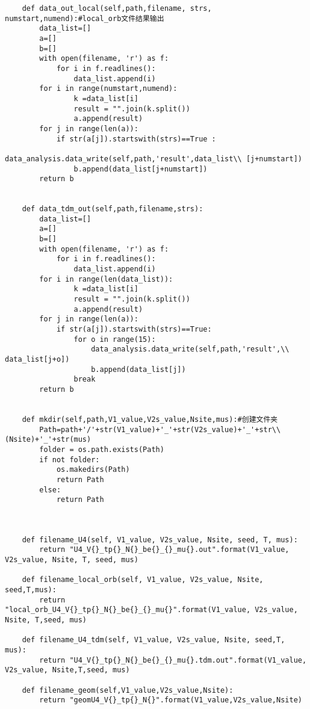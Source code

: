 \begin{description}
\begin{lstlisting}
    def data_out_local(self,path,filename, strs, numstart,numend):#local_orb文件结果输出
        data_list=[]
        a=[]
        b=[]
        with open(filename, 'r') as f:
            for i in f.readlines():
                data_list.append(i)
        for i in range(numstart,numend):
                k =data_list[i]
                result = "".join(k.split())
                a.append(result)
        for j in range(len(a)):
            if str(a[j]).startswith(strs)==True :
                data_analysis.data_write(self,path,'result',data_list\\ [j+numstart])
                b.append(data_list[j+numstart])
        return b


    def data_tdm_out(self,path,filename,strs):
        data_list=[]
        a=[]
        b=[]
        with open(filename, 'r') as f:
            for i in f.readlines():
                data_list.append(i)
        for i in range(len(data_list)):
                k =data_list[i]
                result = "".join(k.split())
                a.append(result)
        for j in range(len(a)):
            if str(a[j]).startswith(strs)==True:
                for o in range(15):
                    data_analysis.data_write(self,path,'result',\\ data_list[j+o])
                    b.append(data_list[j])
                break
        return b


    def mkdir(self,path,V1_value,V2s_value,Nsite,mus):#创建文件夹
        Path=path+'/'+str(V1_value)+'_'+str(V2s_value)+'_'+str\\ (Nsite)+'_'+str(mus)
        folder = os.path.exists(Path)
        if not folder:
            os.makedirs(Path)
            return Path
        else:
            return Path



    def filename_U4(self, V1_value, V2s_value, Nsite, seed, T, mus):
        return "U4_V{}_tp{}_N{}_be{}_{}_mu{}.out".format(V1_value, V2s_value, Nsite, T, seed, mus)

    def filename_local_orb(self, V1_value, V2s_value, Nsite, seed,T,mus):
        return "local_orb_U4_V{}_tp{}_N{}_be{}_{}_mu{}".format(V1_value, V2s_value, Nsite, T,seed, mus)

    def filename_U4_tdm(self, V1_value, V2s_value, Nsite, seed,T, mus):
        return "U4_V{}_tp{}_N{}_be{}_{}_mu{}.tdm.out".format(V1_value, V2s_value, Nsite,T,seed, mus)

    def filename_geom(self,V1_value,V2s_value,Nsite):
        return "geomU4_V{}_tp{}_N{}".format(V1_value,V2s_value,Nsite)


\end{lstlisting}
\end{description}
